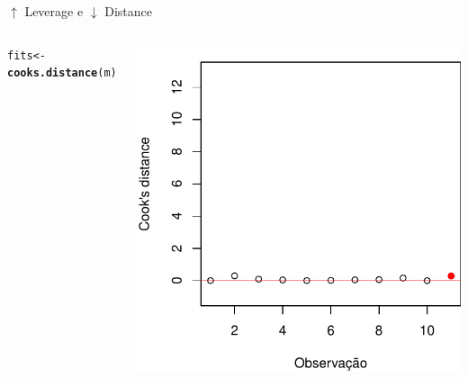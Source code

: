 \documentclass{beamer}\usepackage[]{graphicx}\usepackage[]{color}
\makeatletter
\newcommand{\hlstd}[1]{\textcolor[rgb]{0.345,0.345,0.345}{#1}}%
\newcommand{\hlkwb}[1]{\textcolor[rgb]{0.69,0.353,0.396}{#1}}%
\newcommand{\hlkwd}[1]{\textcolor[rgb]{0.737,0.353,0.396}{\textbf{#1}}}%
\newenvironment{kframe}{%
 \def\at@end@of@kframe{}%
 \ifinner\ifhmode%
  \def\at@end@of@kframe{\end{minipage}}%
  \begin{minipage}{\columnwidth}%
 \fi\fi%
 \def\FrameCommand##1{\hskip\@totalleftmargin \hskip-\fboxsep
 \colorbox{shadecolor}{##1}\hskip-\fboxsep
     \hskip-\linewidth \hskip-\@totalleftmargin \hskip\columnwidth}%
 \MakeFramed {\advance\hsize-\width
   \@totalleftmargin\z@ \linewidth\hsize
   \@setminipage}}%
 {\par\unskip\endMakeFramed%
 \at@end@of@kframe}
\newenvironment{knitrout}{}{} %
\renewenvironment{knitrout}{\setlength{\topsep}{0mm}}{}
\makeatother
\begin{document}
\begin{frame}{$\uparrow$ Leverage e $\downarrow$ Distance}
\begin{columns}[c]
\begin{knitrout}\tiny
{}\color{fgcolor}\begin{kframe}
\begin{alltt}
\hlstd{fits} \hlkwb{<-} \hlkwd{cooks.distance}\hlstd{(m)}
\end{alltt}
\end{kframe}
\includegraphics[width=1\linewidth]{figure/inf12-1} 

\end{knitrout}

\end{columns}
\end{frame}
\end{document}
